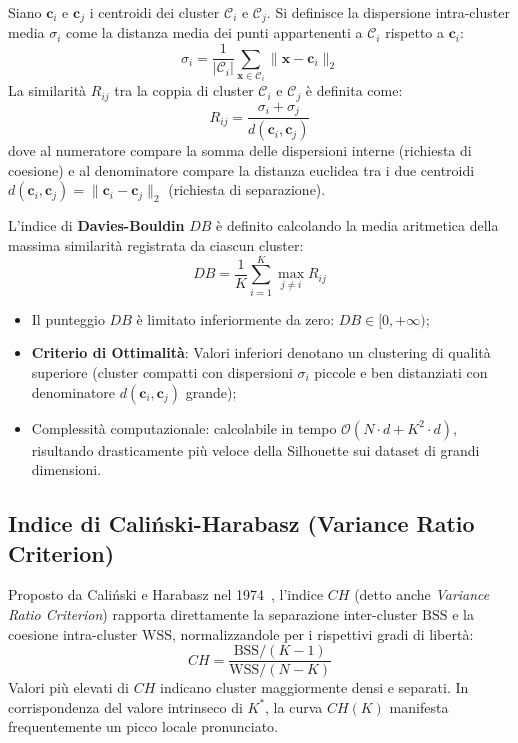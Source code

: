 Siano $\mathbf{c}_i$ e $\mathbf{c}_j$ i centroidi dei cluster $\mathcal{C}_i$ e $\mathcal{C}_j$. Si definisce la dispersione intra-cluster media $\sigma_i$ come la distanza media dei punti appartenenti a $\mathcal{C}_i$ rispetto a $\mathbf{c}_i$:
\begin{equation}
\label{eq:dm-db-sigma}
\sigma_i = \frac{1}{|\mathcal{C}_i|} \sum_{\mathbf{x} \in \mathcal{C}_i} \|\mathbf{x} - \mathbf{c}_i\|_2
\end{equation}
La similarità $R_{ij}$ tra la coppia di cluster $\mathcal{C}_i$ e $\mathcal{C}_j$ è definita come:
\begin{equation}
\label{eq:dm-db-rij}
R_{ij} = \frac{\sigma_i + \sigma_j}{d(\mathbf{c}_i, \mathbf{c}_j)}
\end{equation}
dove al numeratore compare la somma delle dispersioni interne (richiesta di coesione) e al denominatore compare la distanza euclidea tra i due centroidi $d(\mathbf{c}_i, \mathbf{c}_j) = \|\mathbf{c}_i - \mathbf{c}_j\|_2$ (richiesta di separazione).

L'indice di \textbf{Davies-Bouldin} $DB$ è definito calcolando la media aritmetica della massima similarità registrata da ciascun cluster:
\begin{equation}
\label{eq:dm-db-score}
DB = \frac{1}{K} \sum_{i=1}^K \max_{j \ne i} R_{ij}
\end{equation}

\begin{property}
\begin{itemize}[noitemsep]
    \item Il punteggio $DB$ è limitato inferiormente da zero: $DB \in [0, +\infty)$;
    \item \textbf{Criterio di Ottimalità}: Valori inferiori denotano un clustering di qualità superiore (cluster compatti con dispersioni $\sigma_i$ piccole e ben distanziati con denominatore $d(\mathbf{c}_i, \mathbf{c}_j)$ grande);
    \item Complessità computazionale: calcolabile in tempo $\mathcal{O}(N \cdot d + K^2 \cdot d)$, risultando drasticamente più veloce della Silhouette sui dataset di grandi dimensioni.
\end{itemize}
\end{property}

\FloatBarrier
\subsection{Indice di Cali\'nski-Harabasz (Variance Ratio Criterion)}
Proposto da Cali\'nski e Harabasz nel 1974~\cite{calinski1974}, l'indice $CH$ (detto anche \textit{Variance Ratio Criterion}) rapporta direttamente la separazione inter-cluster $\mathrm{BSS}$ e la coesione intra-cluster $\mathrm{WSS}$, normalizzandole per i rispettivi gradi di libertà:
\begin{equation}
\label{eq:dm-calinski-harabasz}
CH = \frac{\mathrm{BSS} / (K - 1)}{\mathrm{WSS} / (N - K)}
\end{equation}
Valori più elevati di $CH$ indicano cluster maggiormente densi e separati. In corrispondenza del valore intrinseco di $K^*$, la curva $CH(K)$ manifesta frequentemente un picco locale pronunciato.

